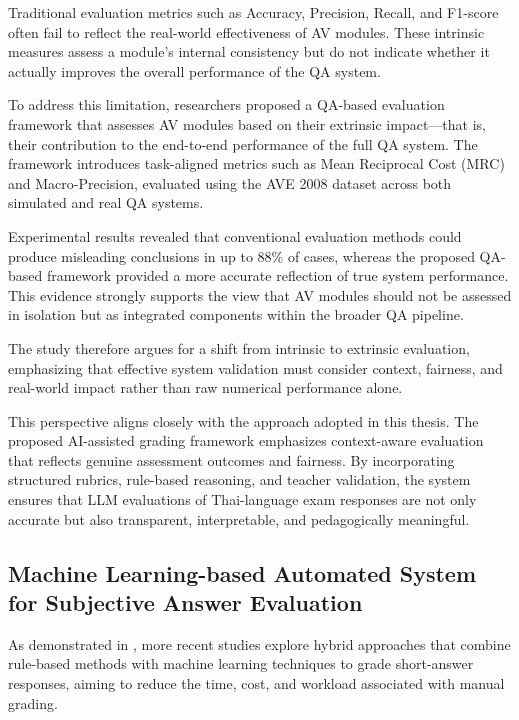 Traditional evaluation metrics such as Accuracy, Precision, 
Recall, and F1-score often fail to reflect the real-world 
effectiveness of AV modules. These intrinsic measures assess 
a module’s internal consistency but do not indicate whether 
it actually improves the overall performance of the QA system.

To address this limitation, researchers proposed a QA-based 
evaluation framework that assesses AV modules based on their 
extrinsic impact—that is, their contribution to the end-to-end 
performance of the full QA system. The framework introduces 
task-aligned metrics such as Mean Reciprocal Cost (MRC) and 
Macro-Precision, evaluated using the AVE 2008 dataset across 
both simulated and real QA systems.

Experimental results revealed that conventional evaluation 
methods could produce misleading conclusions in up to 88\% of 
cases, whereas the proposed QA-based framework provided a more 
accurate reflection of true system performance. This evidence 
strongly supports the view that AV modules should not be 
assessed in isolation but as integrated components within the 
broader QA pipeline.

The study therefore argues for a shift from intrinsic to 
extrinsic evaluation, emphasizing that effective system 
validation must consider context, fairness, and real-world 
impact rather than raw numerical performance alone.

This perspective aligns closely with the approach adopted in 
this thesis. The proposed AI-assisted grading framework emphasizes 
context-aware evaluation that reflects genuine assessment 
outcomes and fairness. By incorporating structured rubrics, 
rule-based reasoning, and teacher validation, the system 
ensures that LLM evaluations of Thai-language exam responses 
are not only accurate but also transparent, interpretable, and 
pedagogically meaningful.


\subsection{Machine Learning-based Automated System for Subjective Answer Evaluation}

As demonstrated in \cite{Dodia2023}, more recent studies 
explore hybrid approaches that combine rule-based methods 
with machine learning techniques to grade short-answer 
responses, aiming to reduce the time, cost, and workload 
associated with manual grading.

